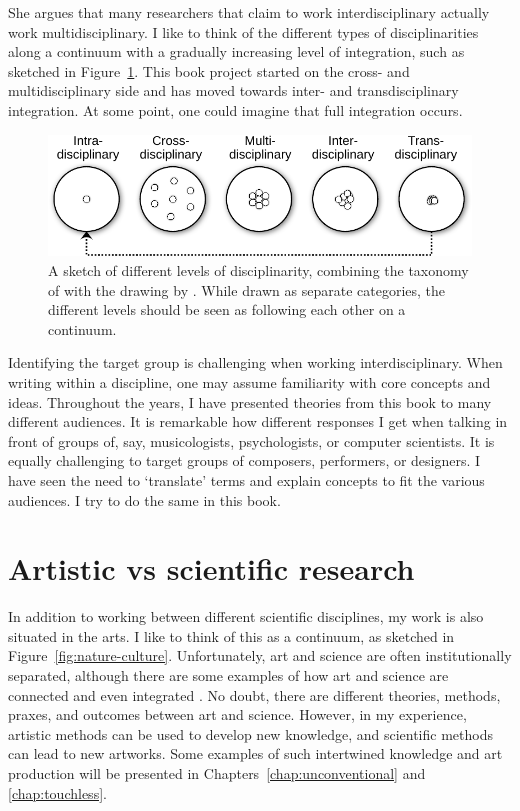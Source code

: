 She argues that many researchers that claim to work interdisciplinary actually work multidisciplinary. I like to think of the different types of disciplinarities along a continuum with a gradually increasing level of integration, such as sketched in Figure~\ref{fig:interdisciplinary}. This book project started on the cross- and multidisciplinary side and has moved towards inter- and transdisciplinary integration. At some point, one could imagine that full integration occurs.

\begin{figure}[tp]
\includegraphics[width=\columnwidth]{figures/01-disciplinarities-crop.pdf}
\caption{A sketch of different levels of disciplinarity, combining the taxonomy of \citet{stember_advancing_1991} with the drawing by \citet{zeigler_dont_1990}. While drawn as separate categories, the different levels should be seen as following each other on a continuum.}
\label{fig:interdisciplinary}
\end{figure}

Identifying the target group is challenging when working interdisciplinary. When writing within a discipline, one may assume familiarity with core concepts and ideas. Throughout the years, I have presented theories from this book to many different audiences. It is remarkable how different responses I get when talking in front of groups of, say, musicologists, psychologists, or computer scientists. It is equally challenging to target groups of composers, performers, or designers. I have seen the need to `translate' terms and explain concepts to fit the various audiences. I try to do the same in this book.


\section{Artistic vs scientific research}

In addition to working between different scientific disciplines, my work is also situated in the arts. I like to think of this as a continuum, as sketched in Figure~\ref{fig:nature-culture}. Unfortunately, art and science are often institutionally separated, although there are some examples of how art and science are connected and even integrated \citep{borgdorrf_conflict_2012}. No doubt, there are different theories, methods, praxes, and outcomes between art and science. However, in my experience, artistic methods can be used to develop new knowledge, and scientific methods can lead to new artworks. Some examples of such intertwined knowledge and art production will be presented in Chapters~\ref{chap:unconventional} and \ref{chap:touchless}.

